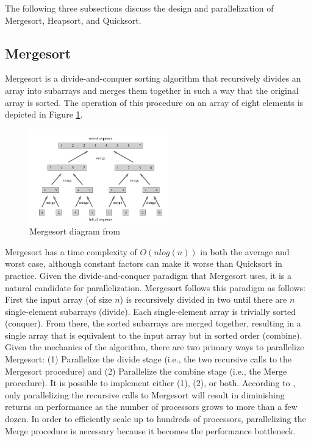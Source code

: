 \documentclass[conference]{IEEEtran}
\begin{document}
    The following three subsections discuss the design and parallelization of Mergesort, Heapsort, and Quicksort.
    
    \subsection{Mergesort}
    Mergesort is a divide-and-conquer sorting algorithm that recursively divides an array into subarrays and merges them together in such a way that the original array is sorted. 
    The operation of this procedure on an array of eight elements is depicted in Figure \ref{mrg}.  
    \begin{figure}[h]
        \includegraphics[width=6cm]{merge.png} 
        \caption{Mergesort diagram from \cite{cormen_introduction_2009}}
        \label{mrg}
    \end{figure}
    Mergesort has a time complexity of $O(nlog(n))$ in both the average and worst case, although constant factors can make it worse than Quicksort in practice. 
    Given the divide-and-conquer paradigm that Mergesort uses, it is a natural candidate for parallelization. Mergesort follows this paradigm as follows: First the input array (of size $n$) is recursively divided in two until there are $n$ single-element subarrays (divide). Each single-element array is trivially sorted (conquer). From there, the sorted subarrays are merged together, resulting in a single array that is equivalent to the input array but in sorted order (combine). Given the mechanics of the algorithm, there are two primary ways to parallelize Mergesort: (1) Parallelize the divide stage (i.e., the two recursive calls to the Mergesort procedure) and (2) Parallelize the combine stage (i.e., the Merge procedure). It is possible to implement either (1), (2), or both. According to \cite{cormen_introduction_2009}, only parallelizing the recursive calls to Mergesort will result in diminishing returns on performance as the number of processors grows to more than a few dozen. In order to efficiently scale up to hundreds of processors, parallelizing the Merge procedure is necessary because it becomes the performance bottleneck.
\end{document}
